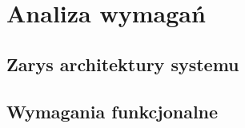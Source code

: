 \chapter{Analiza wymagań}
\section{Zarys architektury systemu}

\section{Wymagania funkcjonalne}



